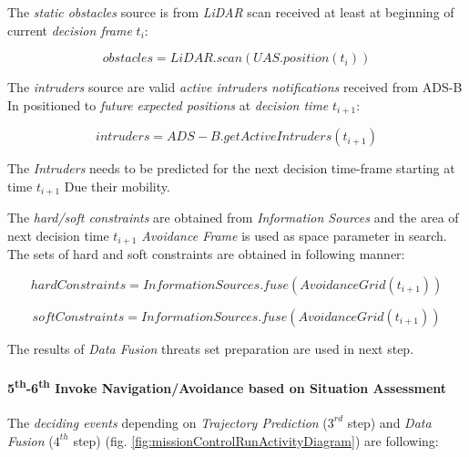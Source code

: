The \emph{static obstacles} source is from \emph{LiDAR} scan received at least at beginning of current \emph{decision frame} $t_i$:

\begin{equation*}
        obstacles=LiDAR.scan(UAS.position(t_i))
\end{equation*}

The \emph{intruders} source are valid \emph{active intruders notifications} received from ADS-B In positioned to \emph{future expected positions} at \emph{decision time} $t_{i+1}$:

\begin{equation*}
        intruders=ADS-B.get Active Intruders(t_{i+1})
\end{equation*}

\begin{note}
    The \emph{Intruders} needs to be predicted for the next decision time-frame starting at time $t_{i+1}$ Due their mobility.
\end{note}

The \emph{hard/soft constraints} are obtained from \emph{Information Sources} and the area of next decision time $t_{i+1}$ \emph{Avoidance Frame} is used as space parameter in search. The sets of hard and soft constraints are obtained in following manner:

\begin{equation*}
    hard Constraints= Information Sources.fuse(Avoidance Grid(t_{i+1}))
\end{equation*}

\begin{equation*}        
        soft Constraints=Information Sources.fuse(Avoidance Grid(t_{i+1}))
\end{equation*}

The results of \emph{Data Fusion} threats set preparation are used in next step.


\paragraph{5\textsuperscript{th}-6\textsuperscript{th} Invoke Navigation/Avoidance based on Situation Assessment} The \emph{deciding events} depending on \emph{Trajectory Prediction} ($3^{rd}$ step) and \emph{Data Fusion} ($4^{th}$ step) (fig. \ref{fig:missionControlRunActivityDiagram}) are following:

